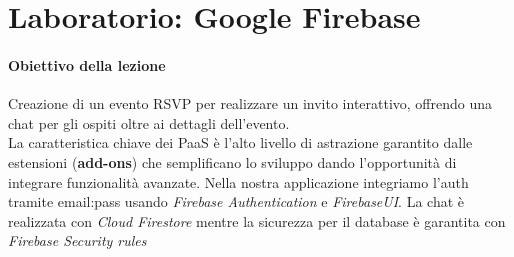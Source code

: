 \section{Laboratorio: Google Firebase} \label{lab4}

\paragraph{Obiettivo della lezione} Creazione di un evento RSVP per realizzare un invito interattivo, offrendo una chat per gli ospiti oltre ai dettagli dell'evento.\\
La caratteristica chiave dei PaaS è l'alto livello di astrazione garantito dalle estensioni (\textbf{add-ons}) che semplificano lo sviluppo dando l'opportunità di integrare funzionalità avanzate. 
Nella nostra applicazione integriamo l'auth tramite email:pass usando \textit{Firebase Authentication} e \textit{FirebaseUI}.
La chat è realizzata con \textit{Cloud Firestore} mentre la sicurezza per il database è garantita con \textit{Firebase Security rules}


